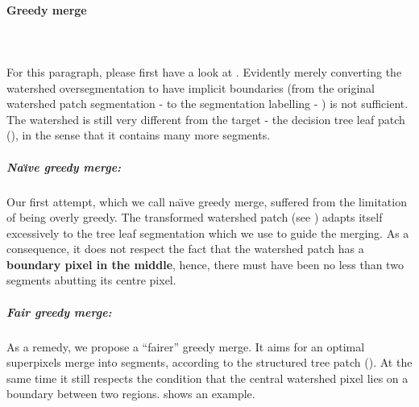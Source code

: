 \paragraph{Greedy merge}\mbox{}\\\mbox{}\\ %
For this paragraph, please first have a look at . Evidently merely converting the watershed oversegmentation to have implicit boundaries (from the original watershed patch segmentation -  to the segmentation labelling - ) is not sufficient. The watershed is still very different from the target - the decision tree leaf patch (), in the sense that it contains many more segments.

\subparagraph{Na\"{\i}ve greedy merge:} Our first attempt, which we call na\"{\i}ve greedy merge, suffered from the limitation of being overly 
greedy. The transformed watershed patch (see ) adapts itself excessively to the tree leaf segmentation which we use to guide the merging. As a consequence, it does not respect the fact that the watershed patch has a \textbf{boundary pixel in the middle}, hence, there must have been no less than two segments abutting its centre pixel.

\subparagraph{Fair greedy merge:}
\label{par:ch4-fair-greedy-merge}
As a remedy, we propose a ``fairer'' greedy merge. It %
aims for an optimal superpixels merge into segments, according to the structured tree patch (). At the same time it still respects the condition that the central watershed pixel lies on a boundary between two regions.  shows an example.

